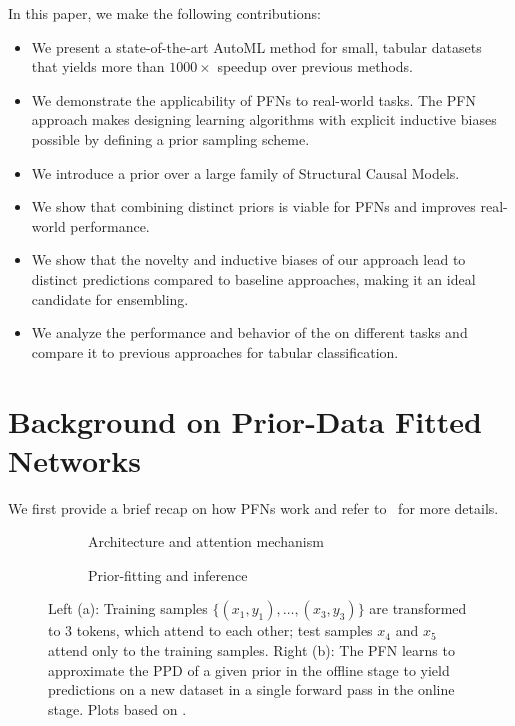 \documentclass{article}
\begin{document}
In this paper, we make the following contributions:
\begin{itemize}
    \item We present a state-of-the-art AutoML method for small, tabular datasets that yields more than $1000\times$ speedup over previous methods.
    \item We demonstrate the applicability of PFNs to real-world tasks. The PFN approach makes designing learning algorithms with explicit inductive biases possible by defining a prior sampling scheme.
    \item We introduce a prior over a large family of Structural Causal Models.
    \item We show that combining distinct priors is viable for PFNs and improves real-world performance.
    \item We show that the novelty and inductive biases of our approach lead to distinct predictions compared to baseline approaches, making it an ideal candidate for ensembling.
    \item We analyze the performance and behavior of the \methodname{} on different tasks and compare it to previous approaches for tabular classification.
\end{itemize}
\fi


\section{Background on Prior-Data Fitted Networks}
\label{sec:prior_fitted_intro}

We first provide a brief recap on how PFNs work and refer to~\cite{muller-iclr22a} for more details.
%
\begin{figure}[t]
     \centering
     \begin{subfigure}[t]{.49\textwidth}
         \centering
         
         \caption{Architecture and attention mechanism}
         \label{fig:transformer_visualization}
     \end{subfigure}
     \begin{subfigure}[t]{.49\textwidth}
         \centering
         
         \caption{Prior-fitting and inference}
         \label{fig:pfn_usage}
     \end{subfigure}
     \caption{Left (a): Training samples $\{(x_1,y_1), \dots, (x_3,y_3)\}$ are transformed to $3$ tokens, which attend to each other; test samples $x_4$ and $x_5$ attend only to the training samples. Right (b): The PFN learns to approximate the PPD of a given prior in the offline stage to yield predictions on a new dataset in a single forward pass in the online stage. Plots based on \cite{muller-iclr22a}.}
     \label{fig:pfn_overview}
\end{figure}
%
%
\end{document}
